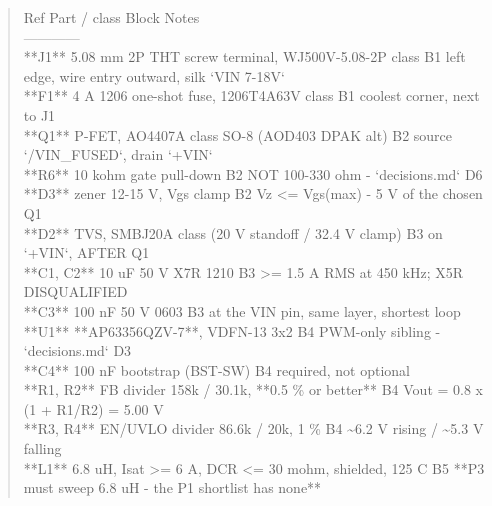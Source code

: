 \documentclass[11pt,a4paper]{article}
\begin{document}
\begin{quote}\small\ttfamily\raggedright
\textbar{} Ref \textbar{} Part / class \textbar{} Block \textbar{} Notes \textbar{}\\
\textbar{}---\textbar{}---\textbar{}---\textbar{}---\textbar{}\\
\textbar{} {*}{*}J1{*}{*} \textbar{} 5.08 mm 2P THT screw terminal, WJ500V-5.08-2P class \textbar{} B1 \textbar{} left edge, wire entry outward, silk `VIN 7-18V` \textbar{}\\
\textbar{} {*}{*}F1{*}{*} \textbar{} 4 A 1206 one-shot fuse, 1206T4A63V class \textbar{} B1 \textbar{} coolest corner, next to J1 \textbar{}\\
\textbar{} {*}{*}Q1{*}{*} \textbar{} P-FET, AO4407A class SO-8 (AOD403 DPAK alt) \textbar{} B2 \textbar{} source `/VIN\_FUSED`, drain `+VIN` \textbar{}\\
\textbar{} {*}{*}R6{*}{*} \textbar{} 10 kohm gate pull-down \textbar{} B2 \textbar{} NOT 100-330 ohm - `decisions.md` D6 \textbar{}\\
\textbar{} {*}{*}D3{*}{*} \textbar{} zener 12-15 V, Vgs clamp \textbar{} B2 \textbar{} Vz \textless{}= Vgs(max) - 5 V of the chosen Q1 \textbar{}\\
\textbar{} {*}{*}D2{*}{*} \textbar{} TVS, SMBJ20A class (20 V standoff / 32.4 V clamp) \textbar{} B3 \textbar{} on `+VIN`, AFTER Q1 \textbar{}\\
\textbar{} {*}{*}C1, C2{*}{*} \textbar{} 10 uF 50 V X7R 1210 \textbar{} B3 \textbar{} \textgreater{}= 1.5 A RMS at 450 kHz; X5R DISQUALIFIED \textbar{}\\
\textbar{} {*}{*}C3{*}{*} \textbar{} 100 nF 50 V 0603 \textbar{} B3 \textbar{} at the VIN pin, same layer, shortest loop \textbar{}\\
\textbar{} {*}{*}U1{*}{*} \textbar{} {*}{*}AP63356QZV-7{*}{*}, VDFN-13 3x2 \textbar{} B4 \textbar{} PWM-only sibling - `decisions.md` D3 \textbar{}\\
\textbar{} {*}{*}C4{*}{*} \textbar{} 100 nF bootstrap (BST-SW) \textbar{} B4 \textbar{} required, not optional \textbar{}\\
\textbar{} {*}{*}R1, R2{*}{*} \textbar{} FB divider 158k / 30.1k, {*}{*}0.5 \% or better{*}{*} \textbar{} B4 \textbar{} Vout = 0.8 x (1 + R1/R2) = 5.00 V \textbar{}\\
\textbar{} {*}{*}R3, R4{*}{*} \textbar{} EN/UVLO divider 86.6k / 20k, 1 \% \textbar{} B4 \textbar{} \textasciitilde{}6.2 V rising / \textasciitilde{}5.3 V falling \textbar{}\\
\textbar{} {*}{*}L1{*}{*} \textbar{} 6.8 uH, Isat \textgreater{}= 6 A, DCR \textless{}= 30 mohm, shielded, 125 C \textbar{} B5 \textbar{} {*}{*}P3 must sweep 6.8 uH - the P1 shortlist has none{*}{*} \textbar{}\\

\end{quote}
\end{document}
